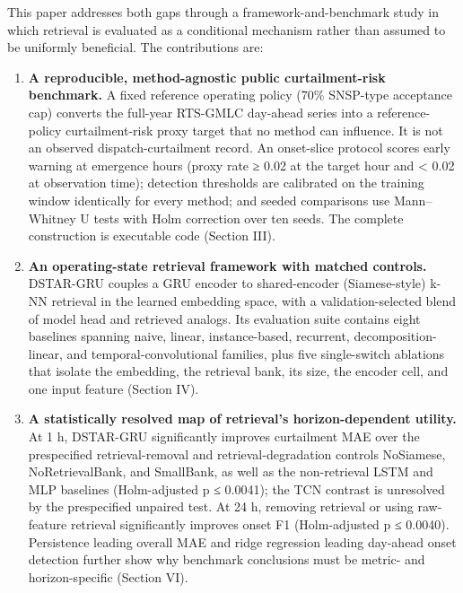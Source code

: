 \documentclass[
  10pt,
  a4paper,
]{article}
\providecommand{\tightlist}{%
  \setlength{\itemsep}{0pt}\setlength{\parskip}{0pt}}
\begin{document}
This paper addresses both gaps through a framework-and-benchmark study
in which retrieval is evaluated as a conditional mechanism rather than
assumed to be uniformly beneficial. The contributions are:

\begin{enumerate}
\def\labelenumi{\arabic{enumi}.}
\tightlist
\item
  \textbf{A reproducible, method-agnostic public curtailment-risk
  benchmark.} A fixed reference operating policy (70\% SNSP-type
  acceptance cap) converts the full-year RTS-GMLC day-ahead series into
  a reference-policy curtailment-risk proxy target that no method can
  influence. It is not an observed dispatch-curtailment record. An
  onset-slice protocol scores early warning at emergence hours (proxy
  rate ≥ 0.02 at the target hour and \textless{} 0.02 at observation
  time); detection thresholds are calibrated on the training window
  identically for every method; and seeded comparisons use Mann--Whitney
  U tests with Holm correction over ten seeds. The complete construction
  is executable code (Section III).
\item
  \textbf{An operating-state retrieval framework with matched controls.}
  DSTAR-GRU couples a GRU encoder to shared-encoder (Siamese-style) k-NN
  retrieval in the learned embedding space, with a validation-selected
  blend of model head and retrieved analogs. Its evaluation suite
  contains eight baselines spanning naive, linear, instance-based,
  recurrent, decomposition-linear, and temporal-convolutional families,
  plus five single-switch ablations that isolate the embedding, the
  retrieval bank, its size, the encoder cell, and one input feature
  (Section IV).
\item
  \textbf{A statistically resolved map of retrieval's horizon-dependent
  utility.} At 1 h, DSTAR-GRU significantly improves curtailment MAE
  over the prespecified retrieval-removal and retrieval-degradation
  controls NoSiamese, NoRetrievalBank, and SmallBank, as well as the
  non-retrieval LSTM and MLP baselines (Holm-adjusted p ≤ 0.0041); the
  TCN contrast is unresolved by the prespecified unpaired test. At 24 h,
  removing retrieval or using raw-feature retrieval significantly
  improves onset F1 (Holm-adjusted p ≤ 0.0040). Persistence leading
  overall MAE and ridge regression leading day-ahead onset detection
  further show why benchmark conclusions must be metric- and
  horizon-specific (Section VI).
\end{enumerate}
\end{document}
